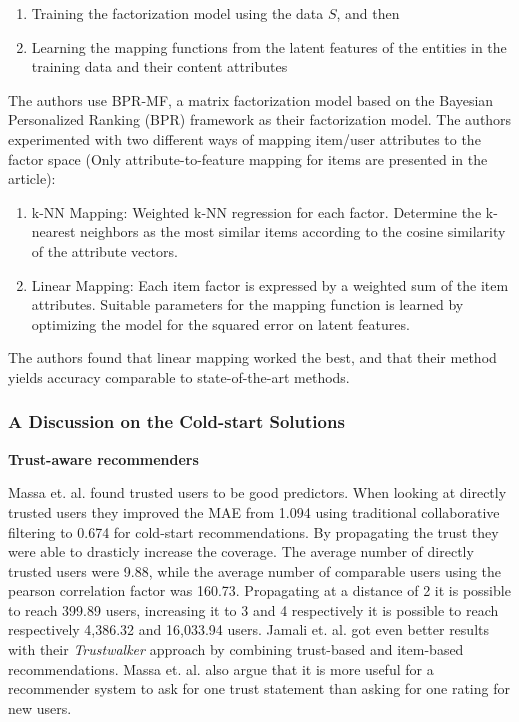 \begin{enumerate}
\item Training the factorization model using the data $S$, and then
\item Learning the mapping functions from the latent features of the entities in the training data and their content attributes
\end{enumerate}

The authors use BPR-MF, a matrix factorization model based on the Bayesian Personalized Ranking (BPR) framework as their factorization model. The authors experimented with two different ways of mapping item/user attributes to the factor space (Only attribute-to-feature mapping for items are presented in the article):

\begin{enumerate}
\item k-NN Mapping:	Weighted k-NN regression for each factor. Determine the k-nearest neighbors as the most similar items according to the cosine similarity of the attribute vectors.
\item Linear Mapping: Each item factor is expressed by a weighted sum of the item attributes. Suitable parameters for the mapping function is learned by optimizing the model for the squared error on latent features.
\end{enumerate}

The authors found that linear mapping worked the best, and that their method yields accuracy comparable to state-of-the-art methods.

\subsubsection{A Discussion on the Cold-start Solutions}

\textbf{Trust-aware recommenders}

Massa et. al. \cite{Massa2007} found trusted users to be good predictors. When looking at directly trusted users they improved the MAE from 1.094 using traditional collaborative filtering to 0.674 for cold-start recommendations. By propagating the trust they were able to drasticly increase the coverage. The average number of directly trusted users were 9.88, while the average number of comparable users using the pearson correlation factor was 160.73. Propagating at a distance of 2 it is possible to reach 399.89 users, increasing it to 3 and 4 respectively it is possible to reach respectively 4,386.32 and 16,033.94 users. Jamali et. al. \cite{Jamali2009} got even better results with their \emph{Trustwalker} approach by combining trust-based and item-based recommendations. Massa et. al. \cite{Massa2004} also argue that it is more useful for a recommender system to ask for one trust statement than asking for one rating for new users.

